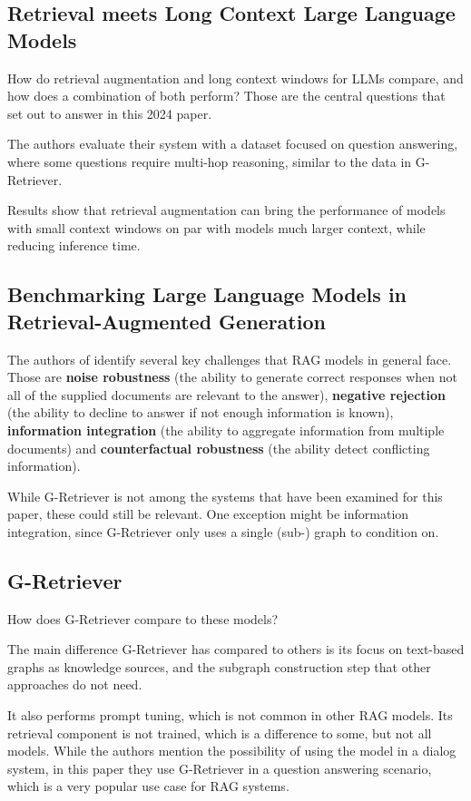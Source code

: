 \subsection{Retrieval meets Long Context Large Language Models}

How do retrieval augmentation and long context windows for LLMs compare, and how does a combination of both perform?
Those are the central questions that \citet{Xu2023RetrievalML} set out to answer in this 2024 paper.

The authors evaluate their system with a dataset focused on question answering, where some questions require multi-hop reasoning, similar to the data in G-Retriever.

Results show that retrieval augmentation can bring the performance of models with small context windows on par with models much larger context, while reducing inference time.

\subsection{Benchmarking Large Language Models in Retrieval-Augmented Generation}

The authors of \citet{benchmarking} identify several key challenges that RAG models in general face. Those are \textbf{noise robustness} (the ability to generate correct responses when not all of the supplied documents are relevant to the answer), \textbf{negative rejection} (the ability to decline to answer if not enough information is known), \textbf{information integration} (the ability to aggregate information from multiple documents) and \textbf{counterfactual robustness} (the ability detect conflicting information).

While G-Retriever is not among the systems that have been examined for this paper, these could still be relevant.
One exception might be information integration, since G-Retriever only uses a single (sub-) graph to condition on.



\subsection{G-Retriever}

How does G-Retriever compare to these models?

The main difference G-Retriever has compared to others is its focus on text-based graphs as knowledge sources, and the subgraph construction step that other approaches do not need.

It also performs prompt tuning, which is not common in other RAG models. Its retrieval component is not trained, which is a difference to some, but not all models.
While the authors mention the possibility of using the model in a dialog system, in this paper they use G-Retriever in a question answering scenario, which is a very popular use case for RAG systems.
